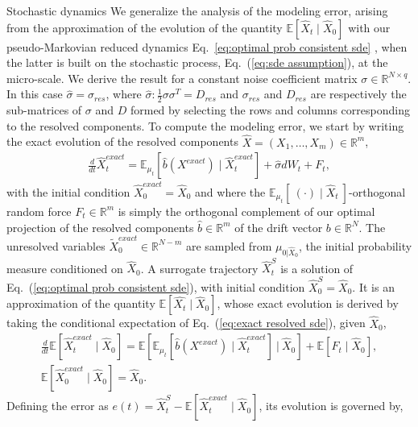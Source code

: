\documentclass[11pt, a4paper, oneside, reqno]{amsart}
\makeatletter
\def\subsection{\@startsection{subsection}{2}%
	\z@{.5\linespacing\@plus.7\linespacing}{.5\linespacing}%
	{\normalfont\large\bfseries}}
\makeatother
\begin{document}
\subsection{Stochastic dynamics}\label{app:error sde}
\noindent We generalize the analysis of the modeling error, arising from the approximation of the evolution of the quantity $\mathbb{E}[\hat{X}_t\mid \hat{X}_0]$ with our pseudo-Markovian reduced dynamics Eq.~\eqref{eq:optimal prob consistent sde} , when the latter is built on the stochastic process, Eq.~(\ref{eq:sde assumption}), at the micro-scale. We derive the result for a constant noise coefficient matrix $\sigma\in \mathbb{R}^{N\times q}$. In this case $\hat{\sigma}=\sigma_{res}$, where $\hat{\sigma}:\frac{1}{2}\sigma\sigma^T=D_{res}$ and $\sigma_{res}$ and $D_{res}$ are respectively the sub-matrices of $\sigma$ and $D$ formed by selecting the rows and columns corresponding to the resolved components. 
To compute the modeling error, we start by writing the exact evolution of the resolved components $\hat{X}=(X_1,\dots,X_m)\in\mathbb{R}^m$,
\begin{eqnarray}\label{eq:exact resolved sde}
    \frac{d}{dt}\hat{X}^{exact}_t = \mathbb{E}_{\mu_t}[\hat{b}(X^{exact})\mid\hat{X}^{exact}_t] + \hat{\sigma}dW_t  + F_t,
\end{eqnarray}
with the initial condition $\hat{X}^{exact}_0 = \hat{X}_0$ and
where the $\mathbb{E}_{\mu_t}[\:(\cdot)\mid\hat{X}_t\:]$-orthogonal random force $F_t \in \mathbb{R}^m$ is simply the orthogonal complement of our optimal projection of the resolved components $\hat{b}\in\mathbb{R}^m$ of the drift vector $b \in \mathbb{R}^N$. 
The unresolved variables $\tilde{X}_0^{exact} \in\mathbb{R}^{N-m}$ are sampled from $\mu_{0|\hat{X}_0}$, the initial probability measure conditioned on $\hat{X}_0$.  
A surrogate trajectory $\hat{X}^S_t$ is a solution of Eq.~(\ref{eq:optimal prob consistent sde}), with initial condition $\hat{X}^{S}_0 = \hat{X}_0$.
It is an approximation of the quantity $\mathbb{E}[\hat{X_t}\mid\hat{X}_0]$, whose exact evolution is derived by taking the conditional expectation of Eq.~(\ref{eq:exact resolved sde}), given $\hat{X}_0$,
\begin{eqnarray}
    \frac{d}{dt}\mathbb{E}[\hat{X}^{exact}_t\mid\hat{X}_0] = \mathbb{E}\left[\mathbb{E}_{\mu_t}[\hat{b}(X^{exact})\mid\hat{X}^{exact}_t] \:\bigg|\: \hat{X}_0 \right] + \mathbb{E}[F_t\mid\hat{X}_0],\\
    \mathbb{E}[\hat{X}_0^{exact}\mid\hat{X}_0] = \hat{X}_0.
\end{eqnarray}
Defining the error as $e(t)=\hat{X}^S_t-\mathbb{E}[\hat{X}^{exact}_t\mid\hat{X}_0]$, its evolution is governed by,
\end{document}
